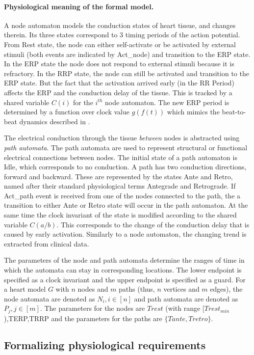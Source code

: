 \paragraph{Physiological meaning of the formal model.}
A node automaton models the conduction states of heart tissue, and changes therein. 
Its three states correspond to 3 timing periods of the action potential. 
From \textsf{Rest} state, the node can either self-activate or be activated by external stimuli (both events are indicated by Act\_node) and transition to the \textsf{ERP} state. 
In the \textsf{ERP} state the node does not respond to external stimuli because it is refractory. 
In the \textsf{RRP} state, the node can still be activated and transition to the \textsf{ERP} state.
But the fact that the activation arrived early (in the RR Period) affects the ERP and the conduction delay of the tissue.  
This is tracked by a shared variable $C(i)$ for the $i^{th}$ node automaton. 
The new ERP period is determined by a function over clock value $g(f(t))$ which mimics the beat-to-beat dynamics described in \cite{josephson}. 

The electrical conduction through the tissue \emph{between} nodes is abstracted using \emph{path automata}. 
The path automata are used to represent structural or functional electrical connections between nodes. 
The initial state of a path automaton is \textsf{Idle}, which corresponds to no conduction. 
A path has two conduction directions, forward and backward.
These are represented by the states Ante and Retro, named after their standard physiological terms Antegrade and Retrograde.
If \textsf{Act\_path} event is received from one of the nodes connected to the path, the a transition to either \textsf{Ante} or \textsf{Retro} state will occur in the path automaton. 
At the same time the clock invariant of the state is modified according to the shared variable $C(a/b)$. 
This corresponds to the change of the conduction delay that is caused by early activation. 
Similarly to a node automaton, the changing trend is extracted from clinical data. 

The parameters of the node and path automata determine the ranges of time in which the automata can stay in corresponding locations. 
The lower endpoint is specified as a clock invariant and the upper endpoint is specified as a guard. 
For a heart model $G$ with $n$ nodes and $m$ paths (thus, $n$ vertices and $m$ edges), the node automata are denoted as $N_i, i\in[n]$ and path automata are denoted as $P_j,j\in[m]$. 
The parameters for the nodes are $Trest$ (with range $[Trest_{min}$),TERP,TRRP and the parameters for the paths are $\{Tante,Tretro\}$. 

\subsection{Formalizing physiological requirements}


%